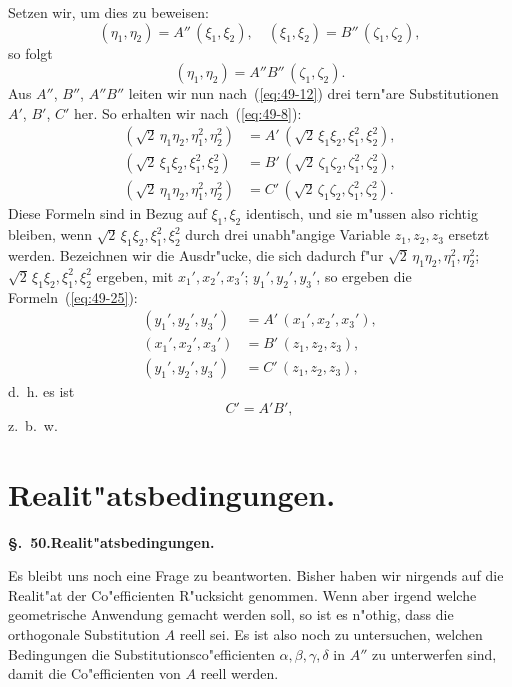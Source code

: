 \documentclass[12pt,a4paper]{article}
\theoremstyle{definition}
\begin{document}
Setzen wir, um dies zu beweisen:
\begin{equation}\label{eq:49-23}
(\eta_1, \eta_2) = A''\,(\xi_1, \xi_2), \quad (\xi_1, \xi_2) = B''\,(\zeta_1, \zeta_2),
\end{equation}
so folgt
\begin{equation}\label{eq:49-24}
(\eta_1, \eta_2) = A''B''\,(\zeta_1, \zeta_2).
\end{equation}
Aus $A''$, $B''$, $A''B''$ leiten wir nun nach~(\ref{eq:49-12}) drei tern"are Substitutionen $A'$, $B'$, $C'$ her. So erhalten wir nach~(\ref{eq:49-8}):
\begin{equation}\label{eq:49-25}
\begin{aligned}
(\sqrt{2}\,\eta_1\eta_2, \eta_1^2, \eta_2^2) &= A'\,(\sqrt{2}\,\xi_1\xi_2, \xi_1^2, \xi_2^2), \\
(\sqrt{2}\,\xi_1\xi_2, \xi_1^2, \xi_2^2) &= B'\,(\sqrt{2}\,\zeta_1\zeta_2, \zeta_1^2, \zeta_2^2), \\
(\sqrt{2}\,\eta_1\eta_2, \eta_1^2, \eta_2^2) &= C'\,(\sqrt{2}\,\zeta_1\zeta_2, \zeta_1^2, \zeta_2^2).
\end{aligned}
\end{equation}
Diese Formeln sind in Bezug auf $\xi_1, \xi_2$ identisch, und sie m"ussen also richtig bleiben, wenn $\sqrt{2}\,\xi_1\xi_2, \xi_1^2, \xi_2^2$ durch drei unabh"angige Variable $z_1, z_2, z_3$ ersetzt werden. Bezeichnen wir die Ausdr"ucke, die sich dadurch f"ur $\sqrt{2}\,\eta_1\eta_2, \eta_1^2, \eta_2^2$; $\sqrt{2}\,\xi_1\xi_2, \xi_1^2, \xi_2^2$ ergeben, mit $x_1', x_2', x_3'$; $y_1', y_2', y_3'$, so ergeben die Formeln~(\ref{eq:49-25}):
\begin{align*}
(y_1', y_2', y_3') &= A'\,(x_1', x_2', x_3'), \\
(x_1', x_2', x_3') &= B'\,(z_1, z_2, z_3), \\
(y_1', y_2', y_3') &= C'\,(z_1, z_2, z_3),
\end{align*}
d.~h. es ist
\[
C' = A'B',
\]
z.~b.~w.


\section{Realit"atsbedingungen.}\label{sec:50}

\noindent\textbf{\S.~50.}\quad\textbf{Realit"atsbedingungen.}
\vspace{0.3cm}

Es bleibt uns noch eine Frage zu beantworten. Bisher haben wir nirgends auf die Realit"at der Co"efficienten R"ucksicht genommen. Wenn aber irgend welche geometrische Anwendung gemacht werden soll, so ist es n"othig, dass die orthogonale Substitution $A$ reell sei. Es ist also noch zu untersuchen, welchen Bedingungen die Substitutionsco"efficienten $\alpha, \beta, \gamma, \delta$ in $A''$ zu unterwerfen sind, damit die Co"efficienten von $A$ reell werden.
\end{document}
